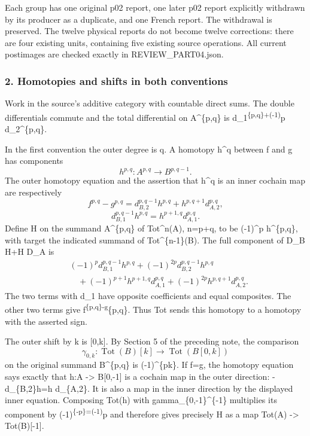 \documentclass[11pt]{article}
\begin{document}
Each group has one original p02 report, one later p02 report explicitly withdrawn by its producer as a duplicate, and one French report. The withdrawal is preserved. The twelve physical reports do not become twelve corrections: there are four existing units, containing five existing source operations. All current postimages are checked exactly in REVIEW\_PART04.json.

\subsubsection{2. Homotopies and shifts in both conventions}\label{homotopies-and-shifts-in-both-conventions}

Work in the source's additive category with countable direct sums. The double differentials commute and the total differential on A\^{}\{p,q\} is d\_1\textsuperscript{\{p,q\}+(-1)}p d\_2\^{}\{p,q\}.

In the first convention the outer degree is q. A homotopy h\^{}q between f and g has components \[
h^{p,q}:A^{p,q}\longrightarrow B^{p,q-1}.
\] The outer homotopy equation and the assertion that h\^{}q is an inner cochain map are respectively \[
f^{p,q}-g^{p,q}
=d_{B,2}^{p,q-1}h^{p,q}+h^{p,q+1}d_{A,2}^{p,q},
\] \[
d_{B,1}^{p,q-1}h^{p,q}=h^{p+1,q}d_{A,1}^{p,q}.
\] Define H on the summand A\^{}\{p,q\} of Tot\^{}n(A), n=p+q, to be (-1)\^{}p h\^{}\{p,q\}, with target the indicated summand of Tot\^{}\{n-1\}(B). The full component of D\_B H+H D\_A is \[
\begin{aligned}
&(-1)^p d_{B,1}^{p,q-1}h^{p,q}
 +(-1)^{2p}d_{B,2}^{p,q-1}h^{p,q}\\
&\hspace{1em}
 +(-1)^{p+1}h^{p+1,q}d_{A,1}^{p,q}
 +(-1)^{2p}h^{p,q+1}d_{A,2}^{p,q}.
\end{aligned}
\] The two terms with d\_1 have opposite coefficients and equal composites. The other two terms give f\textsuperscript{\{p,q\}-g}\{p,q\}. Thus Tot sends this homotopy to a homotopy with the asserted sign.

The outer shift by k is {[}0,k{]}. By Section 5 of the preceding note, the comparison \[
\gamma_{0,k}:\operatorname{Tot}(B)[k]
\longrightarrow\operatorname{Tot}(B[0,k])
\] on the original summand B\^{}\{p,q\} is (-1)\^{}\{pk\}. If f=g, the homotopy equation says exactly that h:A -\textgreater{} B{[}0,-1{]} is a cochain map in the outer direction: -d\_\{B,2\}h=h d\_\{A,2\}. It is also a map in the inner direction by the displayed inner equation. Composing Tot(h) with gamma\_\{0,-1\}\^{}\{-1\} multiplies its component by (-1)\textsuperscript{\{-p\}=(-1)}p and therefore gives precisely H as a map Tot(A) -\textgreater{} Tot(B){[}-1{]}.
\end{document}
